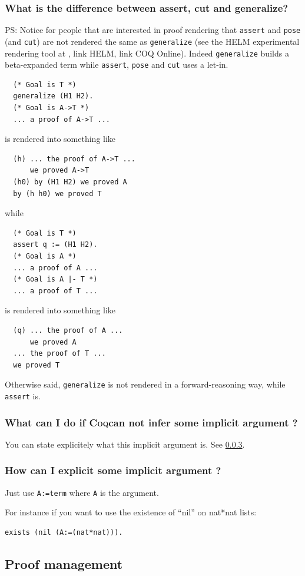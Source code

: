 \documentclass[a4paper,pdftex]{article}
\def\Question#1{\stepcounter{question}\subsubsection{#1}}
\def\Coq{\textsc{Coq}}
\def\cut{{\tt cut}}
\def\assert{{\tt assert}}
\def\generalize{{\tt generalize}}
\def\pose{{\tt pose}}
\begin{document}
\Question{What is the difference between assert, cut and generalize?}

PS: Notice for people that are interested in proof rendering that \assert
and {\pose} (and \cut) are not rendered the same as {\generalize} (see the
HELM experimental rendering tool at , link
HELM, link COQ Online). Indeed {\generalize} builds a beta-expanded term
while \assert, {\pose} and {\cut} uses a let-in.

\begin{verbatim}
  (* Goal is T *)
  generalize (H1 H2).
  (* Goal is A->T *)
  ... a proof of A->T ...
\end{verbatim}

is rendered into something like
\begin{verbatim}
  (h) ... the proof of A->T ...
      we proved A->T
  (h0) by (H1 H2) we proved A
  by (h h0) we proved T
\end{verbatim}
while 
\begin{verbatim}
  (* Goal is T *)
  assert q := (H1 H2).
  (* Goal is A *)
  ... a proof of A ...
  (* Goal is A |- T *)
  ... a proof of T ...
\end{verbatim}
is rendered into something like
\begin{verbatim}
  (q) ... the proof of A ...
      we proved A
  ... the proof of T ...
  we proved T
\end{verbatim}
Otherwise said, {\generalize} is not rendered in a forward-reasoning way,
while {\assert} is.

\Question{What can I do if \Coq can not infer some implicit argument ?}

You can state explicitely what this implicit argument is. See \ref{implicit}.

\Question{How can I explicit some implicit argument ?}\label{implicit}

Just use \texttt{A:=term} where \texttt{A} is the argument.

For instance if you want to use the existence of ``nil'' on nat*nat lists:
\begin{verbatim}
exists (nil (A:=(nat*nat))).
\end{verbatim}

\subsection{Proof management}
\end{document}
